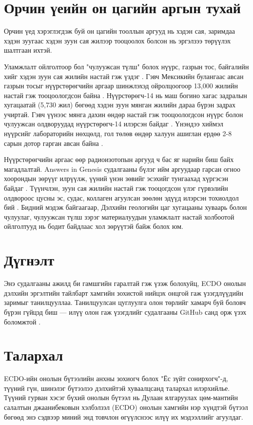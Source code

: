 \documentclass[10pt,twocolumn,letterpaper]{article}
\begin{document}
\section{Орчин үеийн он цагийн аргын тухай}

Орчин үед хэрэглэгдэж буй он цагийн тооллын аргууд нь хэдэн сая, заримдаа хэдэн зуугаас хэдэн зуун сая жилээр тооцоолох болсон нь эргэлзээ төрүүлэх шалтгаан ихтэй.

Уламжлалт ойлголтоор бол "чулуужсан түлш" болох нүүрс, газрын тос, байгалийн хийг хэдэн зуун сая жилийн настай гэж үздэг \cite{104}. Гэвч Мексикийн булангаас авсан газрын тосыг нүүрстөрөгчийн аргаар шинжлэхэд ойролцоогоор 13,000 жилийн настай гэж тооцоологдсон байна \cite{105}. Нүүрстөрөгч-14 нь маш богино хагас задралын хугацаатай (5,730 жил) бөгөөд хэдэн зуун мянган жилийн дараа бүрэн задрах учиртай. Гэвч үүнээс мянга дахин өндөр настай гэж тооцоологдсон нүүрс болон чулуужсан олдворуудад нүүрстөрөгч-14 илэрсэн байдаг \cite{106}. Үнэндээ хиймэл нүүрсийг лабораторийн нөхцөлд, гол төлөв өндөр халуун ашиглан ердөө 2-8 сарын дотор гарган авсан байна \cite{107}.

Нүүрстөрөгчийн аргаас өөр радиоизотопын аргууд ч бас яг нарийн биш байх магадлалтай. Answers in Genesis судалгааны бүлэг ийм аргуудаар гарсан огноо хоорондын зөрүүг илрүүлж, үүний үнэн зөвийг эсэхийг тунгаахад хүргэсэн байдаг \cite{108}. Түүнчлэн, зуун сая жилийн настай гэж тооцогдсон үлэг гүрвэлийн олдвороос цусны эс, судас, коллаген агуулсан зөөлөн эдүүд илэрсэн тохиолдол бий \cite{109,110}. Бидний мэдэж байгаагаар, Дэлхийн геологийн цаг хугацааны хуваарь болон чулуулаг, чулуужсан түлш зэрэг материалуудын уламжлалт настай холбоотой ойлголтууд нь бодит байдлаас хол зөрүүтэй байж болох юм.

\section{Дүгнэлт}

Энэ судалгааны ажилд би гамшгийн гаралтай гэж үзэж болохуйц, ECDO онолын дэлхийн эргэлтийн тайлбарт хамгийн зохистой нийцэх онцгой гаж үзэгдлүүдийн заримыг танилцууллаа. Танилцуулсан цуглуулга олон төрлийг хамарч буй боловч бүрэн гүйцэд биш — илүү олон гаж үзэгдлийг судалгааны GitHub санд орж үзэх боломжтой \cite{2}.

\section{Талархал}

ECDO-ийн онолын бүтээлийн анхны зохиогч болох "Ёс зүйт сонирхогч"-д, түүний гүн, шинэлэг бүтээлээ дэлхийтэй хуваалцсанд талархал илэрхийлье. Түүний гурван хэсэг бүхий онолын бүтээл \cite{1} нь Дулаан ялгаруулах цөм-мантийн салалтын джаанибековын хэлбэлзэл (ECDO) онолын хамгийн нэр хүндтэй бүтээл бөгөөд энэ сэдвээр миний энд товчлон өгүүлснээс илүү их мэдээллийг агуулдаг.
\end{document}
